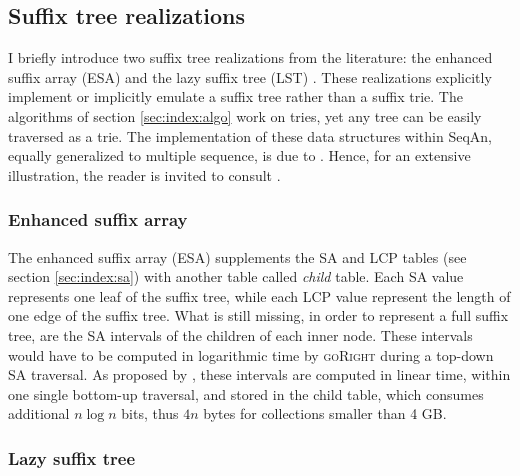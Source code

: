 
\subsection{Suffix tree realizations}
\label{sec:index:stree}

I briefly introduce two suffix tree realizations from the literature: the enhanced suffix array (ESA) \citep{Abouelhoda2004} and the lazy suffix tree (LST) \citep{Giegerich2003}.
These realizations explicitly implement or implicitly emulate a suffix tree rather than a suffix trie.
The algorithms of section \ref{sec:index:algo} work on tries, yet any tree can be easily traversed as a trie.
The implementation of these data structures within SeqAn, equally generalized to multiple sequence, is due to \citeauthor{Weese2013}.
Hence, for an extensive illustration, the reader is invited to consult \citep{Weese2013}.

\subsubsection{Enhanced suffix array}
\label{sec:index:esa}

The enhanced suffix array (ESA) \citep{Abouelhoda2004} supplements the SA and LCP tables (see section \ref{sec:index:sa}) with another table called \emph{child} table.
Each SA value represents one leaf of the suffix tree, while each LCP value represent the length of one edge of the suffix tree.
What is still missing, in order to represent a full suffix tree, are the SA intervals of the children of each inner node.
These intervals would have to be computed in logarithmic time by \textsc{goRight} during a top-down SA traversal.
As proposed by \cite{Abouelhoda2004}, these intervals are computed in linear time, within one single bottom-up traversal, and stored in the child table, which consumes additional $n \log n$ bits, thus $4n$ bytes for collections smaller than 4 GB.

\subsubsection{Lazy suffix tree}
\label{sec:index:lst}

